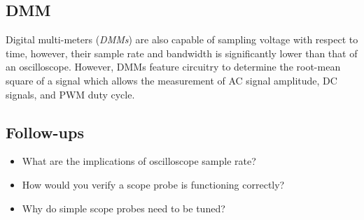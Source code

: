 \documentclass[main.tex]{subfiles}
\begin{document}
\subsection{DMM}
Digital multi-meters (\textit{DMMs}) are also capable of sampling voltage with respect to time, however, their sample rate and bandwidth is significantly lower than that of an oscilloscope. However, DMMs feature circuitry to determine the root-mean square of a signal which allows the measurement of AC signal amplitude, DC signals, and PWM duty cycle.

\subsection{Follow-ups}
\begin{itemize}  
    \item What are the implications of oscilloscope sample rate?
    \item How would you verify a scope probe is functioning correctly?
    \item Why do simple scope probes need to be tuned?
\end{itemize}
\end{document}
